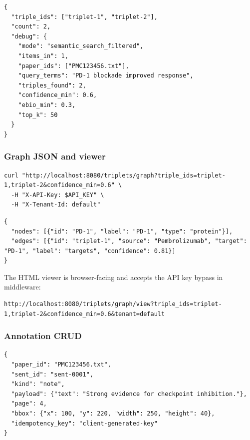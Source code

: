 \documentclass[10pt,letterpaper]{article}
\begin{document}
\begin{Verbatim}[fontsize=\scriptsize,breaklines=true,breakanywhere=true]
{
  "triple_ids": ["triplet-1", "triplet-2"],
  "count": 2,
  "debug": {
    "mode": "semantic_search_filtered",
    "items_in": 1,
    "paper_ids": ["PMC123456.txt"],
    "query_terms": "PD-1 blockade improved response",
    "triples_found": 2,
    "confidence_min": 0.6,
    "ebio_min": 0.3,
    "top_k": 50
  }
}
\end{Verbatim}

\subsubsection{Graph JSON and viewer}

\begin{Verbatim}[fontsize=\scriptsize,breaklines=true,breakanywhere=true]
curl "http://localhost:8080/triplets/graph?triple_ids=triplet-1,triplet-2&confidence_min=0.6" \
  -H "X-API-Key: $API_KEY" \
  -H "X-Tenant-Id: default"
\end{Verbatim}

\begin{Verbatim}[fontsize=\scriptsize,breaklines=true,breakanywhere=true]
{
  "nodes": [{"id": "PD-1", "label": "PD-1", "type": "protein"}],
  "edges": [{"id": "triplet-1", "source": "Pembrolizumab", "target": "PD-1", "label": "targets", "confidence": 0.81}]
}
\end{Verbatim}

The HTML viewer is browser-facing and accepts the API key bypass in middleware:

\begin{Verbatim}[fontsize=\scriptsize,breaklines=true,breakanywhere=true]
http://localhost:8080/triplets/graph/view?triple_ids=triplet-1,triplet-2&confidence_min=0.6&tenant=default
\end{Verbatim}

\subsubsection{Annotation CRUD}

\begin{Verbatim}[fontsize=\scriptsize,breaklines=true,breakanywhere=true]
{
  "paper_id": "PMC123456.txt",
  "sent_id": "sent-0001",
  "kind": "note",
  "payload": {"text": "Strong evidence for checkpoint inhibition."},
  "page": 4,
  "bbox": {"x": 100, "y": 220, "width": 250, "height": 40},
  "idempotency_key": "client-generated-key"
}
\end{Verbatim}
\end{document}
